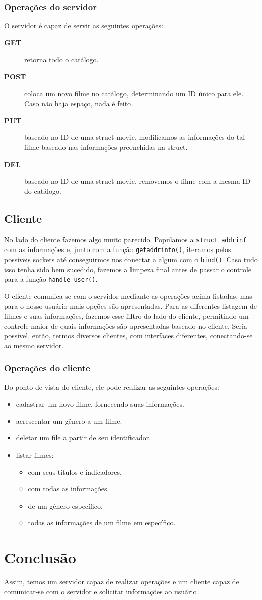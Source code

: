 \documentclass[11pt]{article}
\theoremstyle{definition}
\theoremstyle{definition}
\theoremstyle{remark}
\theoremstyle{remark}
\theoremstyle{remark}
\theoremstyle{remark}
\theoremstyle{definition}
\begin{document}
\subsubsection*{Operações do servidor}
\label{sec:org920b4cb}
O servidor é capaz de servir as seguintes operações:
\begin{description}
\item[{\textbf{GET}}] retorna todo o catálogo.
\item[{\textbf{POST}}] coloca um novo filme no catálogo, determinando um ID único para ele. Caso não haja espaço, nada é feito.
\item[{\textbf{PUT}}] baseado no ID de uma struct movie, modificamos as informações do tal filme baseado nas informações preenchidas na struct.
\item[{\textbf{DEL}}] baseado no ID de uma struct movie, removemos o filme com a mesma ID do catálogo.
\end{description}


\subsection*{Cliente}
\label{sec:org3a8640a}
No lado do cliente fazemos algo muito parecido. Populamos a \texttt{struct addrinf} com as informações e, junto com a função \texttt{getaddrinfo()}, iteramos pelos possíveis sockets até conseguirmos nos conectar a algum com o \texttt{bind()}. Caso tudo isso tenha sido bem sucedido, fazemos a limpeza final antes de passar o controle para a função \texttt{handle\_user()}.

O cliente comunica-se com o servidor mediante as operações acima listadas, mas para o nosso usuário mais opções são apresentadas. Para as diferentes listagem de filmes e suas informações, fazemos esse filtro do lado do cliente, permitindo um controle maior de quais informações são apresentadas baseado no cliente. Seria possível, então, termos diversos clientes, com interfaces diferentes, conectando-se ao mesmo servidor.

\subsubsection*{Operações do cliente}
\label{sec:org5cebaef}
Do ponto de vista do cliente, ele pode realizar as seguintes operações:

\begin{itemize}
\item cadastrar um novo filme, fornecendo suas informações.
\item acrescentar um gênero a um filme.
\item deletar um file a partir de seu identificador.
\item listar filmes:
\begin{itemize}
\item com seus títulos e indicadores.
\item com todas as informações.
\item de um gênero específico.
\item todas as informações de um filme em específico.
\end{itemize}
\end{itemize}

\section*{Conclusão}
\label{sec:org04c374d}
Assim, temos um servidor capaz de realizar operações e um cliente capaz de comunicar-se com o servidor e solicitar informações ao usuário.
\end{document}
